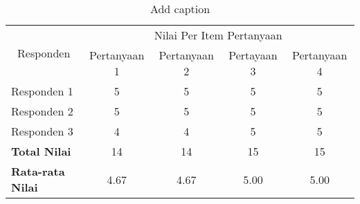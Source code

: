 \begin{table}[htbp]
  \centering
  \caption{Add caption}
    \begin{tabular}{|l|c|c|c|c|}
    \toprule
    \multicolumn{1}{|c|}{\multirow{2}[4]{*}{Responden}} & \multicolumn{4}{c|}{Nilai Per Item Pertanyaan} \\
\cmidrule{2-5}          & Pertanyaan 1 & Pertanyaan 2 & Pertayaan 3 & Pertanyaan 4 \\
    \midrule
    Responden 1 & 5     & 5     & 5     & 5 \\
    \midrule
    Responden 2 & 5     & 5     & 5     & 5 \\
    \midrule
    Responden 3 & 4     & 4     & 5     & 5 \\
    \midrule
    \textbf{Total Nilai} & 14    & 14    & 15    & 15 \\
    \midrule
    \textbf{Rata-rata Nilai} & 4.67  & 4.67  & 5.00  & 5.00 \\
    \bottomrule
    \end{tabular}%
  \label{tab:addlabel}%
\end{table}%
